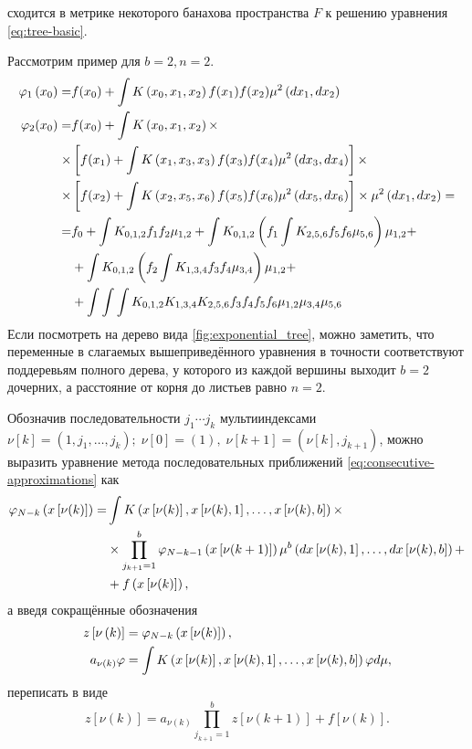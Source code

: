 сходится в метрике некоторого банахова пространства $F$ к решению уравнения \eqref{eq:tree-basic}.

Рассмотрим пример для $b=2, n=2$.
\begin{align*}
\varphi_1\left(x_0\right) = &f(x_0) + \int K\left(x_0, x_1, x_2\right)f(x_1)f(x_2)\mu^2\left(dx_1,dx_2\right) \\
\varphi_2(x_0) = &f(x_0) + \int K\left(x_0, x_1, x_2\right)\times \\
\times&\left[f(x_1) + \int K\left(x_1, x_3, x_3\right)f(x_3)f(x_4)\mu^2\left(dx_3,dx_4\right)\right]\times \\
\times&\left[
	f(x_2) + \int K\left(x_2, x_5, x_6\right)f(x_5)f(x_6)\mu^2\left(dx_5,dx_6\right)
\right]\times\mu^2\left(dx_1,dx_2\right) =\\
=& f_0 + \int K_{0,1,2}f_1f_2\mu_{1,2} + 
	\int K_{0,1,2}\left(f_1\int K_{2,5,6}f_5f_6\mu_{5,6}\right)\mu_{1,2} + \\
	&+ \int K_{0,1,2}\left(f_2\int K_{1,3,4}f_3f_4\mu_{3,4}\right)\mu_{1,2} + \\
	&+ \int\int\int K_{0,1,2}K_{1,3,4}K_{2,5,6}f_3f_4f_5f_6\mu_{1,2}\mu_{3,4}\mu_{5,6}
\end{align*}
Если посмотреть на дерево вида \ref{fig:exponential_tree}, можно заметить, что переменные в слагаемых вышеприведённого уравнения в точности соответствуют поддеревьям полного дерева, у которого из каждой вершины выходит $b=2$ дочерних, а расстояние от корня до листьев равно $n=2$.

Обозначив последовательности $j_1\cdots j_k$ мультииндексами $\nu[k] = (1, j_1, \ldots, j_k); \;\nu[0] = (1), \;\nu[k+1] = (\nu[k], j_{k+1})$, можно выразить уравнение метода последовательных приближений \eqref{eq:consecutive-approximations} как
$$
	\begin{aligned}
		\varphi_{N-k}\left(x\left[\nu(k)\right]\right) = 
		&\int K\left(
			x\left[\nu(k)\right], x\left[\nu(k),1\right], \ldots ,x\left[\nu(k),b\right]
		\right) \times \\
		&\times\prod_{j_{k+1} = 1}^b \varphi_{N-k-1}\left(x\left[\nu(k+1)\right]\right)\mu^b\left(
			dx\left[\nu(k), 1\right],\ldots,dx\left[\nu(k),b\right]
		\right) + \\
		&+ f\left(x\left[\nu(k)\right]\right),
	\end{aligned}
$$
а введя сокращённые обозначения 
$$
	\begin{aligned}
	z\left[\nu\left(k\right)\right] &= \varphi_{N-k}\left(x\left[\nu(k)\right]\right), \\
	a_{\nu\left(k\right)}\varphi &= \int K\left(
			x\left[\nu(k)\right], x\left[\nu(k),1\right], \ldots ,x\left[\nu(k),b\right]
		\right) \varphi d\mu,
	\end{aligned}
$$
переписать в виде
$$
	z\left[\nu\left(k\right)\right] = a_{\nu\left(k\right)}\prod_{j_{k+1} = 1}^b z\left[\nu\left(k+1\right)\right] + f\left[\nu\left(k\right)\right].
$$

